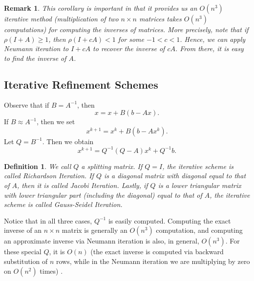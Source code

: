 \documentclass[12pt,reqno]{amsart}
\numberwithin{equation}{section}  %
\newtheorem*{definition}{Definition}
\newtheorem*{remark}{Remark}
\begin{document}
\begin{remark}
This corollary is important in that it provides us  an $O(n^3)$ iterative method
(multiplication of two $n \times n$ matrices takes $O(n^3)$ computations) for
computing the inverses of matrices. More precisely, note that if $\rho(I + A)
\ge 1$, then $\rho(I + cA) < 1$ for some $-1 < c < 1$. Hence, we can apply
Neumann iteration to $I + cA$ to recover the inverse of $cA$. From there, it is
easy to find the inverse of $A$.
\end{remark}

\subsection{Iterative Refinement Schemes}
Observe that if $B = A^{-1}$, then
\begin{equation*}
x = x + B(b - Ax).
\end{equation*}
If $B \approx A^{-1}$, then we set
\begin{equation*}
x^{k+1} = x^{k} + B(b - Ax^{k}).
\end{equation*}
Let $Q = B^{-1}$. Then we obtain
\begin{equation*}
x^{k+1} = Q^{-1}(Q - A)x^{k} + Q^{-1}b.
\end{equation*}
\begin{definition}
We call $Q$ a \emph{splitting} matrix. If $Q = I$, the iterative scheme is
called \emph{Richardson Iteration}. If $Q$ is a diagonal matrix with diagonal
equal to that of $A$, then it is called \emph{Jacobi Iteration}. Lastly, if $Q$
is a lower triangular matrix with lower triangular part (including the diagonal)
equal to that of $A$, the iterative scheme is called \emph{Gauss-Seidel
Iteration}.
\end{definition}
Notice that in all three cases, $Q^{-1}$ is easily computed. Computing the exact inverse
of an $n \times n$ matrix is generally an $O(n^3)$ computation, and computing
an approximate inverse via Neumann iteration is also, in general, $O(n^3)$. For these special $Q$, 
it is $O(n)$ (the exact inverse is computed via backward substitution of $n$ rows, while in the
Neumann iteration we are multiplying by zero on $O(n^2)$ times) .
\end{document}
